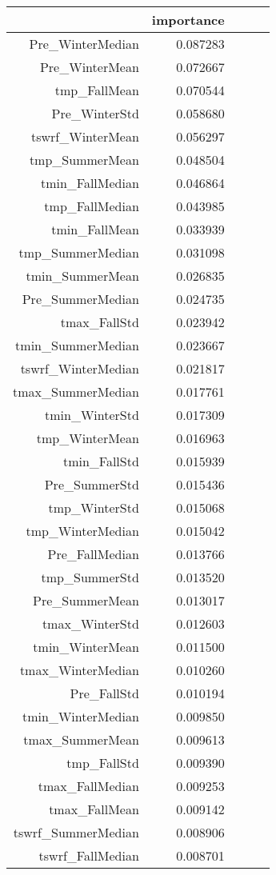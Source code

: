 \begin{tabular}{rrrrr}
\toprule
 & importance \\
\midrule
Pre_WinterMedian & 0.087283 \\
Pre_WinterMean & 0.072667 \\
tmp_FallMean & 0.070544 \\
Pre_WinterStd & 0.058680 \\
tswrf_WinterMean & 0.056297 \\
tmp_SummerMean & 0.048504 \\
tmin_FallMedian & 0.046864 \\
tmp_FallMedian & 0.043985 \\
tmin_FallMean & 0.033939 \\
tmp_SummerMedian & 0.031098 \\
tmin_SummerMean & 0.026835 \\
Pre_SummerMedian & 0.024735 \\
tmax_FallStd & 0.023942 \\
tmin_SummerMedian & 0.023667 \\
tswrf_WinterMedian & 0.021817 \\
tmax_SummerMedian & 0.017761 \\
tmin_WinterStd & 0.017309 \\
tmp_WinterMean & 0.016963 \\
tmin_FallStd & 0.015939 \\
Pre_SummerStd & 0.015436 \\
tmp_WinterStd & 0.015068 \\
tmp_WinterMedian & 0.015042 \\
Pre_FallMedian & 0.013766 \\
tmp_SummerStd & 0.013520 \\
Pre_SummerMean & 0.013017 \\
tmax_WinterStd & 0.012603 \\
tmin_WinterMean & 0.011500 \\
tmax_WinterMedian & 0.010260 \\
Pre_FallStd & 0.010194 \\
tmin_WinterMedian & 0.009850 \\
tmax_SummerMean & 0.009613 \\
tmp_FallStd & 0.009390 \\
tmax_FallMedian & 0.009253 \\
tmax_FallMean & 0.009142 \\
tswrf_SummerMedian & 0.008906 \\
tswrf_FallMedian & 0.008701 \\

\end{tabular}
